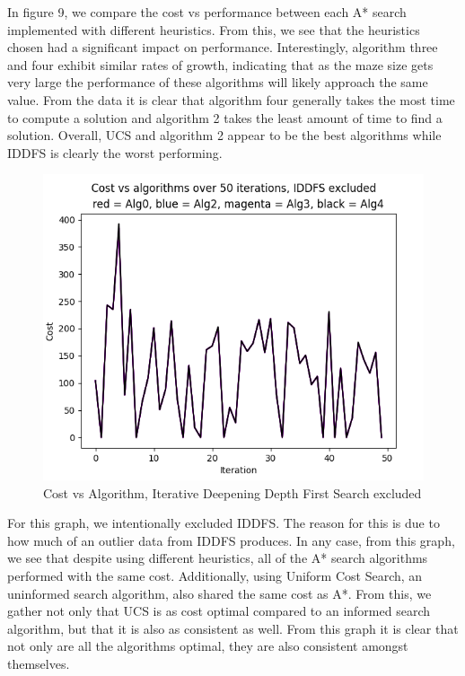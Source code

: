 \documentclass[a4paper]{article}
\begin{document}
In figure 9, we compare the cost vs performance between each A* search implemented with different heuristics. From this, we see that the heuristics chosen had a significant impact on performance. Interestingly, algorithm three and four exhibit similar rates of growth, indicating that as the maze size gets very large the performance of these algorithms will likely approach the same value. From the data it is clear that algorithm four generally takes the most time to compute a solution and algorithm 2 takes the least amount of time to find a solution. Overall, UCS and algorithm 2 appear to be the best algorithms while IDDFS is clearly the worst performing.  
\newpage
\begin{figure}[ht]
    \centering
    \includegraphics[width=\textwidth]{CVA50N.png}
    \caption{Cost vs Algorithm, Iterative Deepening Depth First Search excluded}
    \label{fig:CostVsAlgs}
\end{figure}
For this graph, we intentionally excluded IDDFS. The reason for this is due to how much of an outlier data from IDDFS produces. In any case, from this graph, we see that despite using different heuristics, all of the A* search algorithms performed with the same cost. Additionally, using Uniform Cost Search, an uninformed search algorithm, also shared the same cost as A*. From this, we gather not only that UCS is as cost optimal compared to an informed search algorithm, but that it is also as consistent as well. From this graph it is clear that not only are all the algorithms optimal, they are also consistent amongst themselves.
\newpage
\end{document}
